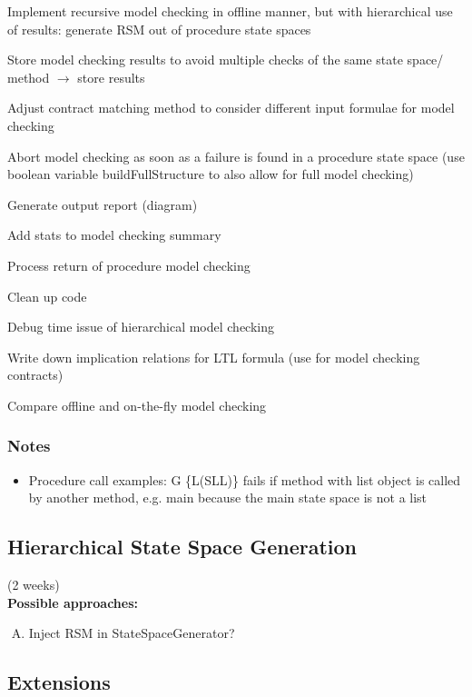 \documentclass[a4paper,12pt]{article}
\begin{document}
\begin{todolist}
	\item Implement recursive model checking in offline manner, but with hierarchical use of results: generate RSM out of procedure state spaces
	\item Store model checking results to avoid multiple checks of the same state space/ method $\rightarrow$ store results
	\item Adjust contract matching method to consider different input formulae for model checking
	\item Abort model checking as soon as a failure is found in a procedure state space (use boolean variable buildFullStructure to also allow for full model checking)
	\item Generate output report (diagram)
	\item Add stats to model checking summary
	\item Process return of procedure model checking
	\item Clean up code
	\item Debug time issue of hierarchical model checking
	\item Write down implication relations for LTL formula (use for model checking contracts)
	\item Compare offline and on-the-fly model checking
\end{todolist}

\subsubsection{Notes}

\begin{itemize}
	\item Procedure call examples: G \{L(SLL)\} fails if method with list object is called by another method, e.g. main because the main state space is not a list
\end{itemize}

\subsection{Hierarchical State Space Generation}
(2 weeks)\\

\textbf{Possible approaches:}
\begin{enumerate}[(A)]
\item Inject RSM in StateSpaceGenerator?
\end{enumerate}

\subsection{Extensions}	
\end{document}
